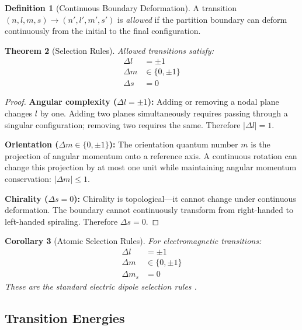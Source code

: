 \documentclass[twocolumn,10pt,a4paper]{article}
\newtheorem{theorem}{Theorem}[section]
\newtheorem{corollary}[theorem]{Corollary}
\theoremstyle{definition}
\newtheorem{definition}[theorem]{Definition}
\theoremstyle{remark}
\begin{document}
\begin{definition}[Continuous Boundary Deformation]
A transition $(n, l, m, s) \to (n', l', m', s')$ is \emph{allowed} if the partition boundary can deform continuously from the initial to the final configuration.
\end{definition}

\begin{theorem}[Selection Rules]
\label{thm:selection_rules}
Allowed transitions satisfy:
\begin{align}
    \Delta l &= \pm 1 \\
    \Delta m &\in \{0, \pm 1\} \\
    \Delta s &= 0
\end{align}
\end{theorem}

\begin{proof}
\textbf{Angular complexity ($\Delta l = \pm 1$):}
Adding or removing a nodal plane changes $l$ by one. Adding two planes simultaneously requires passing through a singular configuration; removing two requires the same. Therefore $|\Delta l| = 1$.

\textbf{Orientation ($\Delta m \in \{0, \pm 1\}$):}
The orientation quantum number $m$ is the projection of angular momentum onto a reference axis. A continuous rotation can change this projection by at most one unit while maintaining angular momentum conservation: $|\Delta m| \leq 1$.

\textbf{Chirality ($\Delta s = 0$):}
Chirality is topological---it cannot change under continuous deformation. The boundary cannot continuously transform from right-handed to left-handed spiraling. Therefore $\Delta s = 0$.
\end{proof}

\begin{corollary}[Atomic Selection Rules]
For electromagnetic transitions:
\begin{align}
    \Delta l &= \pm 1 \\
    \Delta m &\in \{0, \pm 1\} \\
    \Delta m_s &= 0
\end{align}
These are the standard electric dipole selection rules \cite{condon1935}.
\end{corollary}

\subsection{Transition Energies}
\end{document}
